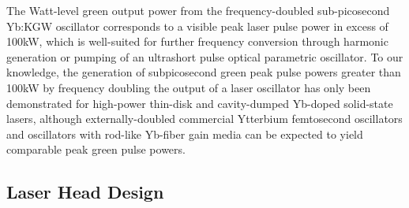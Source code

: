 The Watt-level green output power from the frequency-doubled sub-picosecond Yb:KGW oscillator corresponds to a visible peak laser pulse power in excess of 100kW, which is well-suited for further frequency conversion through harmonic generation or pumping of an ultrashort pulse optical parametric oscillator.
To our knowledge, the generation of subpicosecond green peak pulse powers greater than 100kW by frequency doubling the output of a laser oscillator has only been demonstrated for high-power thin-disk \cite{Brunner_powerful_2004,Marchese_pulse_energy_06} and cavity-dumped \cite{Palmer_microjoule_07} Yb-doped solid-state lasers, although externally-doubled commercial Ytterbium femtosecond oscillators \cite{website_amplitude,website_solar,website_high_q,website_time_bandwidth} and oscillators with rod-like Yb-fiber gain media \cite{Ortac_pulse_2007} can be expected to yield comparable peak green pulse powers.

\subsection{Laser Head Design}

